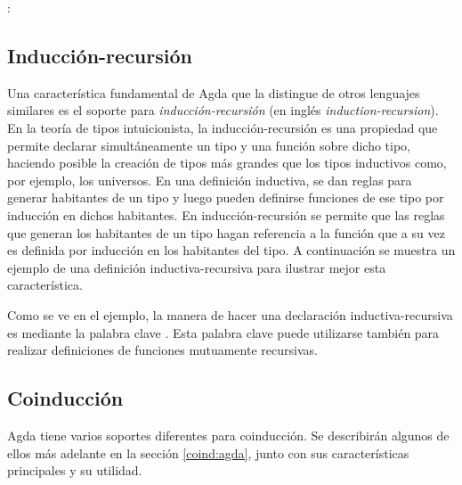  \AgdaSymbol{:} 

 \AgdaSymbol{:} \AgdaSymbol{(} : \AgdaSymbol{)} \AgdaSymbol{$\rightarrow$}  

\AgdaFunction{$\_\sqcup\_$} \AgdaSymbol{:} \AgdaSymbol{(} \AgdaSymbol{:} \AgdaSymbol{)} \AgdaSymbol{$\rightarrow$} 


\subsection{Inducción-recursión}\label{additional:ind-rec}

Una característica fundamental de Agda que la distingue de otros lenguajes similares es el soporte para \textit{inducción-recursión} (en inglés \textit{induction-recursion}). En la teoría de tipos intuicionista, la inducción-recursión es una propiedad que permite declarar simultáneamente un tipo y una función sobre dicho tipo, haciendo posible la creación de tipos más grandes que los tipos inductivos como, por ejemplo, los universos. En una definición inductiva, se dan reglas para generar habitantes de un tipo y luego pueden definirse funciones de ese tipo por inducción en dichos habitantes. En inducción-recursión se permite que las reglas que generan los habitantes de un tipo hagan referencia a la función que a su vez es definida por inducción en los habitantes del tipo. A continuación se muestra un ejemplo de una definición inductiva-recursiva para ilustrar mejor esta característica. 


Como se ve en el ejemplo, la manera de hacer una declaración inductiva-recursiva es mediante la palabra clave . Esta palabra clave puede utilizarse también para realizar definiciones de funciones mutuamente recursivas. 


\subsection{Coinducción}\label{agda:coinduction}

Agda tiene varios soportes diferentes para coinducción. Se describirán algunos de ellos más adelante en la sección \ref{coind:agda}, junto con sus características principales y su utilidad.